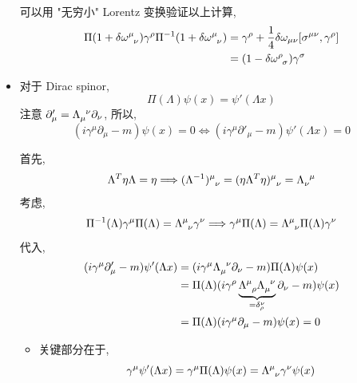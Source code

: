 \begin{itemize}
\begin{tcolorbox}[title=calculation:]
		\noindent\hdashrule[0.5ex]{\linewidth}{0.5pt}{1mm} %
		
		可以用 "无穷小" Lorentz 变换验证以上计算,
		\begin{align}
			\Pi(1 + \delta \tensor{\omega}{^\mu_\nu}) \gamma^\rho \Pi^{- 1}(1 + \delta \tensor{\omega}{^\mu_\nu}) &= \gamma^\rho + \frac{1}{4} \delta \omega_{\mu \nu} [\sigma^{\mu \nu}, \gamma^\rho] \notag \\
			&= (1 - \delta \tensor{\omega}{^\rho_\sigma}) \gamma^\sigma
		\end{align}
	\end{tcolorbox}
	
	\item 对于 Dirac spinor,
	\begin{equation}
		\Pi(\Lambda) \psi(x) = \psi'(\Lambda x)
	\end{equation}
	注意 $\partial'_\mu = \tensor{\Lambda}{_\mu^\nu} \partial_\nu$, 所以,
	\begin{equation}
		(i \gamma^\mu \partial_\mu - m) \psi(x) = 0 \iff (i \gamma^\mu \partial'_\mu - m) \psi'(\Lambda x) = 0
	\end{equation}
	
	\begin{tcolorbox}[title=calculation:]
		首先,
		\begin{equation}
			\Lambda^T \eta \Lambda = \eta \Longrightarrow \tensor{(\Lambda^{- 1})}{^\mu_\nu} = \tensor{(\eta \Lambda^T \eta)}{^\mu_\nu} = \tensor{\Lambda}{_\nu^\mu}
		\end{equation}
		考虑,
		\begin{equation}
			\Pi^{- 1}(\Lambda) \gamma^\mu \Pi(\Lambda) = \tensor{\Lambda}{^\mu_\nu} \gamma^\nu \Longrightarrow \gamma^\mu \Pi(\Lambda) = \tensor{\Lambda}{^\mu_\nu} \Pi(\Lambda) \gamma^\nu
		\end{equation}
		代入,
		\begin{align}
			(i \gamma^\mu \partial'_\mu - m) \psi'(\Lambda x) &= (i \gamma^\mu \tensor{\Lambda}{_\mu^\nu} \partial_\nu - m) \Pi(\Lambda) \psi(x) \notag \\
			&= \Pi(\Lambda) (i \gamma^\rho \underbrace{\tensor{\Lambda}{^\mu_\rho} \tensor{\Lambda}{_\mu^\nu}}_{= \delta^\nu_\rho} \partial_\nu - m) \psi(x) \notag \\
			&= \Pi(\Lambda) (i \gamma^\mu \partial_\mu - m) \psi(x) = 0
		\end{align}
	\end{tcolorbox}
	\begin{itemize}
		\item 关键部分在于,
		\begin{equation}
			\gamma^\mu \psi'(\Lambda x) = \gamma^\mu \Pi(\Lambda) \psi(x) = \tensor{\Lambda}{^\mu_\nu} \gamma^\nu \psi(x)
		\end{equation}
	\end{itemize}
\end{itemize}

